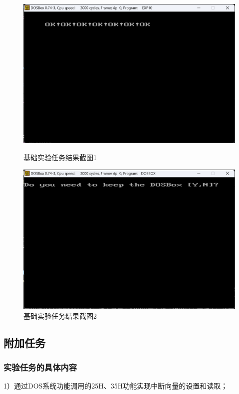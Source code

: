 \documentclass[12pt, a4paper, oneside]{ctexart}
\begin{document}
\begin{figure}[H]
    \centering
    \begin{minipage}{0.45\textwidth}
    \centering
    \includegraphics[scale=0.48]{pic/exp10-3.png}
    \caption{基础实验任务结果截图1}
    \label{基础实验结果截图3}
    \end{minipage}
    \hspace{0.05\textwidth}
    \begin{minipage}{0.45\textwidth}
    \centering
    \includegraphics[scale=0.48]{pic/exp10-4.png}
    \caption{基础实验任务结果截图2}
    \label{基础实验结果截图4}
    \end{minipage}
\end{figure}
\subsection{附加任务}
\subsubsection{实验任务的具体内容}
1）通过DOS系统功能调用的25H、35H功能实现中断向量的设置和读取；
\end{document}
